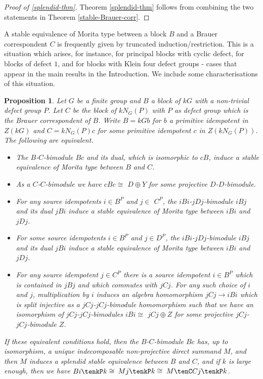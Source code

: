 \documentclass{amsart}
\theoremstyle{plain}\newtheorem{Theorem}{Theorem}[section]
\theoremstyle{plain}\newtheorem{Conjecture}[Theorem]{Conjecture}
\theoremstyle{plain}\newtheorem{Corollary}[Theorem]{Corollary}
\theoremstyle{plain}\newtheorem{Lemma}[Theorem]{Lemma}
\theoremstyle{plain}\newtheorem{Proposition}[Theorem]{Proposition}
\theoremstyle{definition}\newtheorem{Definition}[Theorem]{Definition}
\theoremstyle{definition}\newtheorem{Example}[Theorem]{Example}
\theoremstyle{definition}\newtheorem{Examples}[Theorem]{Examples}
\theoremstyle{definition}\newtheorem{Exercise}[Theorem]{Exercise}
\theoremstyle{definition}\newtheorem{Notation}[Theorem]{Notation}
\theoremstyle{definition}\newtheorem{Remark}[Theorem]{Remark}
\theoremstyle{definition}\newtheorem{Remarks}[Theorem]{Remarks}
\theoremstyle{plain}\newtheorem{Statement}[Theorem]{}
\begin{document}
\begin{proof}[{Proof of \ref{splendid-thm}}]
Theorem \ref{splendid-thm} follows from combining the two statements
in Theorem \ref{stable-Brauer-corr}.
\end{proof}



A stable equivalence of Morita type between a block $B$ and a Brauer
correspondent $C$ is frequently given by truncated induction/restriction.
This is a situation which arises, for instance, for principal blocks with
cyclic defect, for blocks of defect $1$, and for blocks with Klein four
defect groups - cases that appear in the main results in the Introduction.
We include some characterisations of this situation.

\begin{Proposition}  \label{splendid-stable-Prop}
Let $G$ be a finite group and $B$ a block of $kG$ with a non-trivial defect group $P$.
Let $C$ be the block of $kN_G(P)$ with $P$ as defect group which is the Brauer 
correspondent of $B$.  Write $B=kGb$ for $b$ a primitive idempotent in $Z(kG)$
and $C=kN_G(P)c$ for some primitive idempotent $c$ in $Z(kN_G(P))$.
The following are equivalent.
\begin{itemize}
\item[{\rm (i)}]
The $B$-$C$-bimodule $Bc$ and its dual, which is isomorphic to $cB$,
induce a stable equivalence of Morita type between $B$ and $C$.
\item[{\rm (ii)}]
As a $C$-$C$-bimodule we have $cBc\cong$ $D\oplus Y$ for some projective
$D$-$D$-bimodule.
\item[{\rm (iii)}]
For any source idempotents $i\in B^P$ and $j\in $ $C^P$, 
the $iBi$-$jDj$-bimodule $iBj$ and its dual $jBi$ 
induce a stable equivalence of Morita type between $iBi$ and $jDj$.
\item[{\rm (iv)}]
For some source idempotents $i\in B^P$ and $j\in D^P$, 
the $iBi$-$jDj$-bimodule $iBj$ and its dual $jBi$ 
induce a stable equivalence of Morita type between $iBi$ and $jDj$.
\item[{\rm (v)}]
For any source idempotent $j\in C^P$ there is a source idempotent
$i\in B^P$ which is contained in $jBj$ and which commutes with $jCj$.
For any such choice of $i$ and $j$, multiplication by $i$ induces an
algebra homomorphism $jCj\to iBi$ which is split injective as
a $jCj$-$jCj$-bimodule homomorphism such that
we have an isomorphism of $jCj$-$jCj$-bimodules
$iBi \cong$ $jCj\oplus Z$ for some projective $jCj$-$jCj$-bimodule $Z$. 
\end{itemize}
If these equivalent conditions hold, then the $B$-$C$-bimodule $Bc$ has,
up to isomorphism, a unique indecomposable non-projective direct 
summand $M$, and then $M$ induces a splendid stable equivalence
between $B$ and $C$, and if $k$ is large enough, then
we have $Bi\tenkP k\cong$ $Mj\tenkP k\cong$ $M\tenC Cj\tenkP k$.
\end{Proposition}
\end{document}
